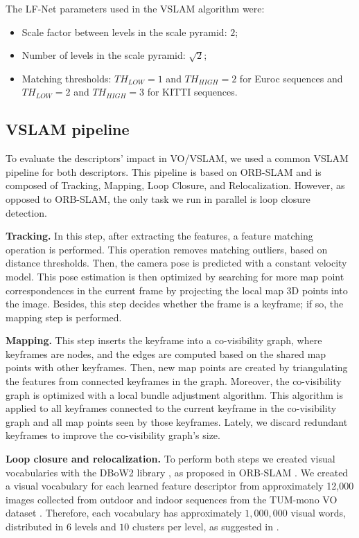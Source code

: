 \documentclass[a4paper, 10pt, conference]{ieeeconf}      %
\begin{document}
The LF-Net parameters used in the VSLAM algorithm were: 

\begin{itemize}
    \item Scale factor between levels in the scale pyramid: $2$;
    \item Number of levels in the scale pyramid: $\sqrt{2}$;
    \item Matching thresholds: $TH_{LOW} = 1$ and $TH_{HIGH} = 2$ for Euroc sequences and $TH_{LOW} = 2$ and $TH_{HIGH} = 3$ for KITTI sequences.
\end{itemize}

\subsection{VSLAM pipeline}

To evaluate the descriptors' impact in VO/VSLAM, we used a common VSLAM pipeline for both descriptors. This pipeline is based on ORB-SLAM \cite{orb-slam} and is composed of Tracking, Mapping, Loop Closure, and Relocalization. However, as opposed to ORB-SLAM, the only task we run in parallel is loop closure detection.

\textbf{Tracking.} In this step, after extracting the features, a feature matching operation is performed. This operation removes matching outliers, based on distance thresholds. Then, the camera pose is predicted with a constant velocity model. This pose estimation is then optimized by searching for more map point correspondences in the current frame by projecting the local map 3D points into the image. Besides, this step decides whether the frame is a keyframe; if so, the mapping step is performed.

\textbf{Mapping.} This step inserts the keyframe into a co-visibility graph, where keyframes are nodes, and the edges are computed based on the shared map points with other keyframes. Then, new map points are created by triangulating the features from connected keyframes in the graph. Moreover, the co-visibility graph is optimized with a local bundle adjustment algorithm. This algorithm is applied to all keyframes connected to the current keyframe in the co-visibility graph and all map points seen by those keyframes. Lately, we discard redundant keyframes to improve the co-visibility graph's size. 

\textbf{Loop closure and relocalization.} To perform both steps we created visual vocabularies with the DBoW2 library \cite{dbow2}, as proposed in ORB-SLAM \cite{orb-slam}. We created a visual vocabulary for each learned feature descriptor from approximately 12,000 images collected from outdoor and indoor sequences from the TUM-mono VO dataset \cite{tum-mono-vo}. Therefore, each vocabulary has approximately $1,000,000$ visual words, distributed in $6$ levels and $10$ clusters per level, as suggested in \cite{vocabulary-based-slam}. 
\end{document}
